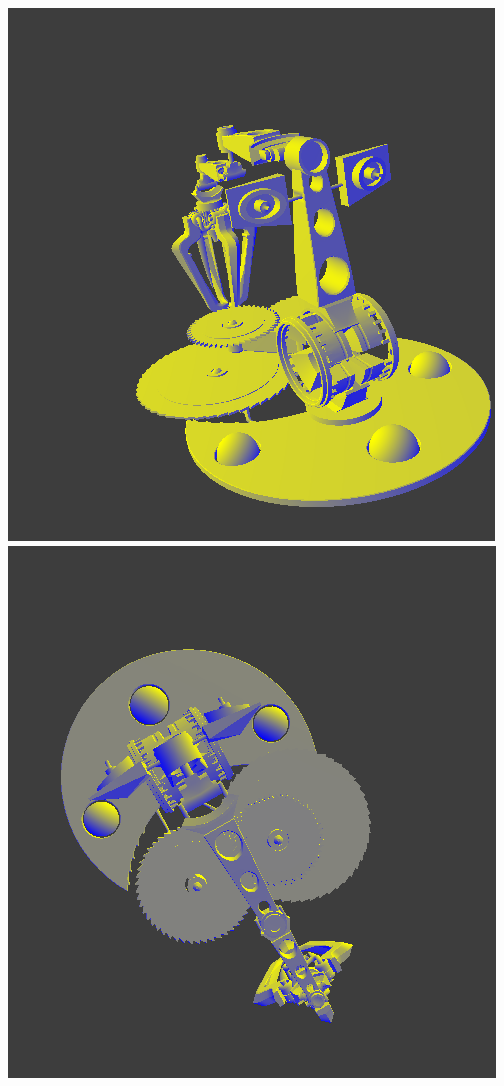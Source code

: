 \documentclass[letterpaper,11pt]{article}
\begin{document}
\includegraphics[scale = .6]{HW3_2_1.png}
\includegraphics[scale = .6]{HW3_2_2.png}
\end{document}
